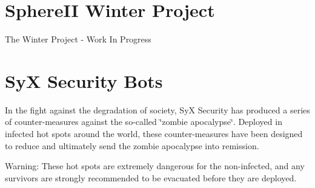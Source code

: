  \hypertarget{index_autotoc_md30}{}\section{Sphere\+I\+I Winter Project}\label{index_autotoc_md30}
The Winter Project -\/ Work In Progress



 \hypertarget{index_autotoc_md32}{}\section{Sy\+X Security Bots}\label{index_autotoc_md32}
In the fight against the degradation of society, SyX Security has produced a series of counter-\/measures against the so-\/called \char`\"{}zombie apocalypse\char`\"{}. Deployed in infected hot spots around the world, these counter-\/measures have been designed to reduce and ultimately send the zombie apocalypse into remission.

Warning\+: These hot spots are extremely dangerous for the non-\/infected, and any survivors are strongly recommended to be evacuated before they are deployed. 
